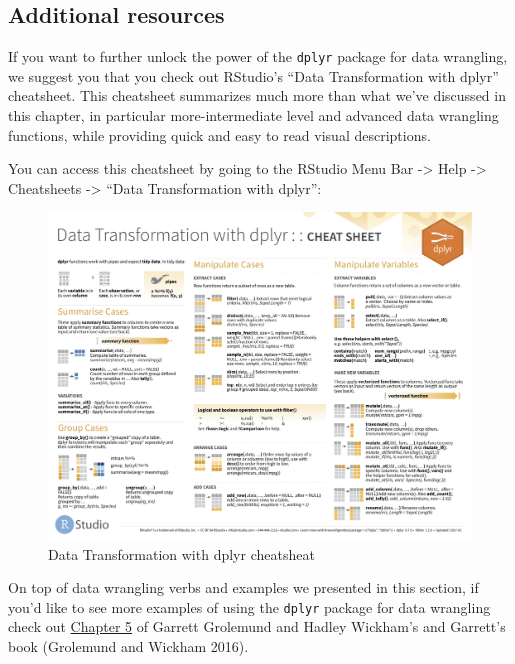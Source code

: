 \documentclass[
  letterpaper,
  DIV=11,
  numbers=noendperiod]{scrreprt}
\theoremstyle{definition}
\theoremstyle{remark}
\begin{document}
\hypertarget{additional-resources-2}{%
\subsection{Additional resources}\label{additional-resources-2}}

If you want to further unlock the power of the \texttt{dplyr} package
for data wrangling, we suggest you that you check out RStudio's ``Data
Transformation with dplyr'' cheatsheet. This cheatsheet summarizes much
more than what we've discussed in this chapter, in particular
more-intermediate level and advanced data wrangling functions, while
providing quick and easy to read visual descriptions.

You can access this cheatsheet by going to the RStudio Menu Bar
-\textgreater{} Help -\textgreater{} Cheatsheets -\textgreater{} ``Data
Transformation with dplyr'':

\begin{figure}

{\centering \includegraphics{images/dplyr_cheatsheet-1.png}

}

\caption{Data Transformation with dplyr cheatsheat}

\end{figure}

On top of data wrangling verbs and examples we presented in this
section, if you'd like to see more examples of using the \texttt{dplyr}
package for data wrangling check out
\href{http://r4ds.had.co.nz/transform.html}{Chapter 5} of Garrett
Grolemund and Hadley Wickham's and Garrett's book (Grolemund and Wickham
2016).
\end{document}
